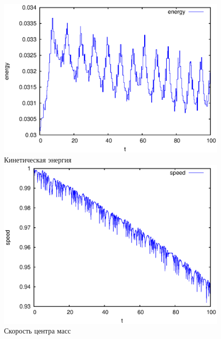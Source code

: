 \begin{figure}[H]
    \centering

    \begin{columns}
            \centering
            \includegraphics[width=\linewidth]{pic/rol__wrench__kinetic_energy}\\
            Кинетическая энергия
            \centering
            \includegraphics[width=\linewidth]{pic/rol__wrench__speed_of_center_of_mass}\\
            Скорость центра масс
    \end{columns}
    

\end{figure}
